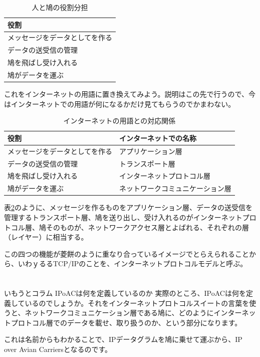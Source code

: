 \begin{table}[hbtp] 			
\begin{center} \label{hatostack}
	\begin{tabular}{l}  \toprule
		役割 \\ \midrule
		メッセージをデータとしてを作る \\
		データの送受信の管理 \\
		鳩を飛ばし受け入れる \\
		鳩がデータを運ぶ \\ \bottomrule
	\end{tabular}
\end{center} \caption{人と鳩の役割分担}
\end{table}

これをインターネットの用語に置き換えてみよう。説明はこの先で行うので、今はインターネットでの用語が何になるかだけ見てもらうのでかまわない。

\begin{table}[hbtp] 
\begin{center} \label{hatostack2}
	\begin{tabular}{ll} \toprule
		役割 & インターネットでの名称 \\ \midrule
		メッセージをデータとしてを作る & アプリケーション層 \\
		データの送受信の管理 & トランスポート層 \\
		鳩を飛ばし受け入れる & インターネットプロトコル層 \\
		鳩がデータを運ぶ & ネットワークコミュニケーション層 \\ \bottomrule
	\end{tabular}
\end{center} \caption{インターネットの用語との対応関係}
\end{table} 

表\ref{hatostack2}のように、メッセージを作るものをアプリケーション層、データの送受信を管理するトランスポート層、鳩を送り出し、受け入れるのがインターネットプロトコル層、鳩そのものが、ネットワークアクセス層とよばれる、それぞれの層（レイヤー）に相当する。

この四つの機能が菱餅のように重なり合っているイメージでとらえられることから、いわｙるるTCP/IPのことを、インターネットプロトコルモデルと呼ぶ。


\section*{}
\begin{itembox}[l]{いもうとコラム IPoACは何を定義しているのか}
実際のところ、IPoACは何を定義しているのでしょうか。それをインターネットプロトコルスイートの言葉を使うと、ネットワークコミュニケーション層である鳩に、どのようにインターネットプロトコル層でのデータを載せ、取り扱うのか、という部分になります。

これは名前からもわかることで、IPデータグラムを鳩に乗せて運ぶから、IP over Avian Carriersとなるのです。

\end{itembox}


